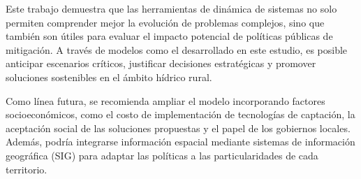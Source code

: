 \documentclass[10pt]{article}
\begin{document}
Este trabajo demuestra que las herramientas de dinámica de sistemas no solo permiten comprender mejor la evolución de problemas complejos, sino que también son útiles para evaluar el impacto potencial de políticas públicas de mitigación. A través de modelos como el desarrollado en este estudio, es posible anticipar escenarios críticos, justificar decisiones estratégicas y promover soluciones sostenibles en el ámbito hídrico rural.

Como línea futura, se recomienda ampliar el modelo incorporando factores socioeconómicos, como el costo de implementación de tecnologías de captación, la aceptación social de las soluciones propuestas y el papel de los gobiernos locales. Además, podría integrarse información espacial mediante sistemas de información geográfica (SIG) para adaptar las políticas a las particularidades de cada territorio.

\printbibliography
\end{document}
